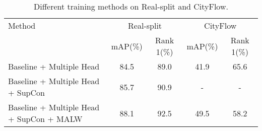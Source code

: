 \begin{table}[]
	\centering
	\begin{tabular}{l|cc|cc}
		\hline
		Method & \multicolumn{2}{c}{Real-split} & \multicolumn{2}{c}{CityFlow}\\
		& mAP(\%)  & Rank 1(\%) & mAP(\%) & Rank 1(\%) \\
		\hline\hline
		Baseline + Multiple Head & 84.5 & 89.0  & 41.9 & 65.6  \\
		\hline
		Baseline + Multiple Head + SupCon & 85.7   & 90.9 & - & -  \\
		\hline
		Baseline + Multiple Head + SupCon + MALW & 88.1  & 92.5 & 49.5 & 58.2  \\
		\hline
	\end{tabular}
	\caption{Different training methods on Real-split and CityFlow.}
	\label{tab:method}
\end{table}